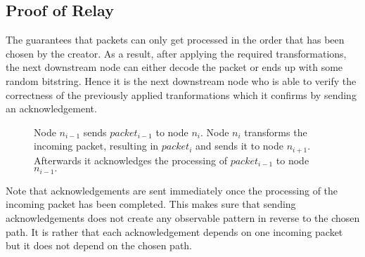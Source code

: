 \subsection{Proof of Relay}
\label{sec:incentives:proofofrelay}

The  guarantees that packets can only get processed in the order that has been chosen by the creator. As a result, after applying the required transformations, the next downstream node can either decode the packet or ends up with some random bitstring. Hence it is the next downstream node who is able to verify the correctness of the previously applied tranformations which it confirms by sending an acknowledgement.

\begin{figure}[H]
      \centering
      \caption{Node $n_{i-1}$ sends $packet_{i-1}$ to node $n_i$. Node $n_i$ transforms the incoming packet, resulting in ${packet_i}$ and sends it to node $n_{i+1}$. Afterwards it acknowledges the processing of $packet_{i-1}$ to node $n_{i-1}.$}
\end{figure}

Note that acknowledgements are sent immediately once the processing of the incoming packet has been completed. This makes sure that sending acknowledgements does not create any observable pattern in reverse to the chosen path. It is rather that each acknowledgement depends on one incoming packet but it does not depend on the chosen path.

